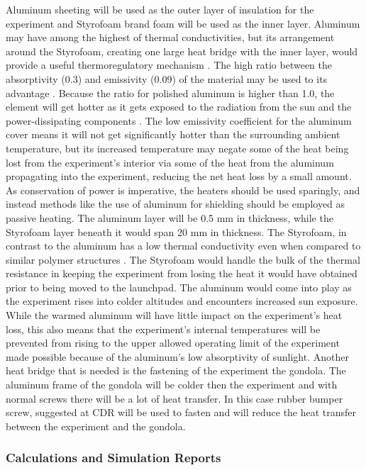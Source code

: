 Aluminum sheeting will be used as the outer layer of insulation for the experiment and Styrofoam brand foam will be used as the inner layer. Aluminum may have among the highest of thermal conductivities, but its arrangement around the Styrofoam, creating one large heat bridge with the inner layer, would provide a useful thermoregulatory mechanism \cite{EngTool}. The high ratio between the absorptivity (0.3) and emissivity (0.09) of the material may be used to its advantage \cite{EngTool}. Because the ratio for polished aluminum is higher than 1.0, the element will get hotter as it gets exposed to the radiation from the sun and the power-dissipating components \cite{RedRok}. The low emissivity coefficient for the aluminum cover means it will not get significantly hotter than the surrounding ambient temperature, but its increased temperature may negate some of the heat being lost from the experiment's interior via some of the heat from the aluminum propagating into the experiment, reducing the net heat loss by a small amount. As conservation of power is imperative, the heaters should be used sparingly, and instead methods like the use of aluminum for shielding should be employed as passive heating. The aluminum layer will be 0.5 mm in thickness, while the Styrofoam layer beneath it would span 20 mm in thickness. The Styrofoam, in contrast to the aluminum has a low thermal conductivity even when compared to similar polymer structures \cite{EngTool}. The Styrofoam would handle the bulk of the thermal resistance in keeping the experiment from losing the heat it would have obtained prior to being moved to the launchpad. The aluminum would come into play as the experiment rises into colder altitudes and encounters increased sun exposure. While the warmed aluminum will have little impact on the experiment's heat loss, this also means that the experiment's internal temperatures will be prevented from rising to the upper allowed operating limit of the experiment made possible because of the aluminum's low absorptivity of sunlight.
Another heat bridge that is needed is the fastening of the experiment the gondola. The aluminum frame of the gondola will be colder then the experiment and with normal screws there will be a lot of heat transfer. In this case rubber bumper screw, suggested at CDR will be used to fasten and will reduce the heat transfer between the experiment and the gondola.


\subsubsection{Calculations and Simulation Reports}
\label{sec:4.6.5}

